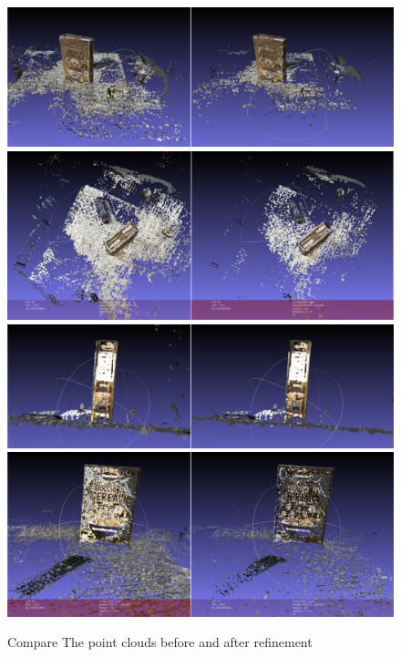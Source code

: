 \documentclass[11pt]{article}
\begin{document}
    \begin{figure}
    \centering
    \includegraphics[width=\textwidth,height=\textheight,keepaspectratio]{images/cereal.1.png}
    \includegraphics[width=\textwidth,height=\textheight,keepaspectratio]{images/cereal.2.png}
    \includegraphics[width=\textwidth,height=\textheight,keepaspectratio]{images/cereal.3.png}
    \includegraphics[width=\textwidth,height=\textheight,keepaspectratio]{images/cereal.4.png}
    \caption{Compare The point clouds before and after refinement}
    \label{fig:cereal}
    \end{figure}
\end{document}
